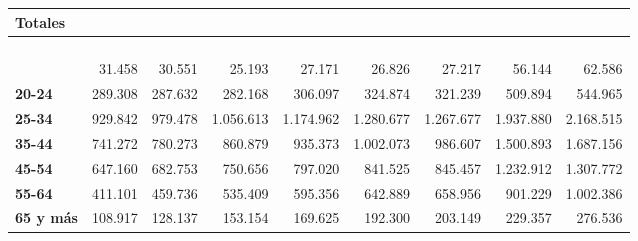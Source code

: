 \documentclass[
  letterpaper,
  DIV=11,
  numbers=noendperiod]{scrartcl}
\begin{document}
\begin{table}
\begin{tabular*}{\linewidth}{@{\extracolsep{\fill}}l|rrrrrrrr}
\multicolumn{9}{l}{{\bfseries Totales}} \\[2.5pt] 
\midrule\addlinespace[2.5pt]
{\bfseries Total} & {\bfseries \cellcolor[HTML]{D9D9D9}{4.855.678}} & {\bfseries \cellcolor[HTML]{D9D9D9}{5.034.466}} & {\bfseries \cellcolor[HTML]{D9D9D9}{5.472.969}} & {\bfseries \cellcolor[HTML]{D9D9D9}{5.890.955}} & {\bfseries \cellcolor[HTML]{D9D9D9}{6.327.872}} & {\bfseries \cellcolor[HTML]{D9D9D9}{5.912.948}} & {\bfseries \cellcolor[HTML]{D9D9D9}{7.989.203}} & {\bfseries \cellcolor[HTML]{D9D9D9}{8.946.725}} \\ 
\midrule\addlinespace[2.5pt]
\multicolumn{9}{l}{{\bfseries Licencias médicas autorizadas según rango de edad y seguro de salud}} \\[2.5pt] 
\midrule\addlinespace[2.5pt]
{\bfseries \fontsize{0}{0}\selectfont \textcolor[HTML]{rgba(255,255,255,0)}{​}} & {\fontsize{0}{0}\selectfont \textcolor[HTML]{rgba(255,255,255,0)}{}} & {\fontsize{0}{0}\selectfont \textcolor[HTML]{rgba(255,255,255,0)}{}} & {\fontsize{0}{0}\selectfont \textcolor[HTML]{rgba(255,255,255,0)}{}} & {\fontsize{0}{0}\selectfont \textcolor[HTML]{rgba(255,255,255,0)}{}} & {\fontsize{0}{0}\selectfont \textcolor[HTML]{rgba(255,255,255,0)}{}} & {\fontsize{0}{0}\selectfont \textcolor[HTML]{rgba(255,255,255,0)}{}} & {\fontsize{0}{0}\selectfont \textcolor[HTML]{rgba(255,255,255,0)}{}} & {\fontsize{0}{0}\selectfont \textcolor[HTML]{rgba(255,255,255,0)}{}} \\ 
\midrule\addlinespace[2.5pt]
\multicolumn{9}{l}{{\bfseries FONASA}} \\[2.5pt] 
\midrule\addlinespace[2.5pt]
{\bfseries 19 y menos} & 31.458 & 30.551 & 25.193 & 27.171 & 26.826 & 27.217 & 56.144 & 62.586 \\ 
{\bfseries 20-24} & 289.308 & 287.632 & 282.168 & 306.097 & 324.874 & 321.239 & 509.894 & 544.965 \\ 
{\bfseries 25-34} & 929.842 & 979.478 & 1.056.613 & 1.174.962 & 1.280.677 & 1.267.677 & 1.937.880 & 2.168.515 \\ 
{\bfseries 35-44} & 741.272 & 780.273 & 860.879 & 935.373 & 1.002.073 & 986.607 & 1.500.893 & 1.687.156 \\ 
{\bfseries 45-54} & 647.160 & 682.753 & 750.656 & 797.020 & 841.525 & 845.457 & 1.232.912 & 1.307.772 \\ 
{\bfseries 55-64} & 411.101 & 459.736 & 535.409 & 595.356 & 642.889 & 658.956 & 901.229 & 1.002.386 \\ 
{\bfseries 65 y más} & 108.917 & 128.137 & 153.154 & 169.625 & 192.300 & 203.149 & 229.357 & 276.536 \\ 

\end{tabular*}
\end{table}
\end{document}
